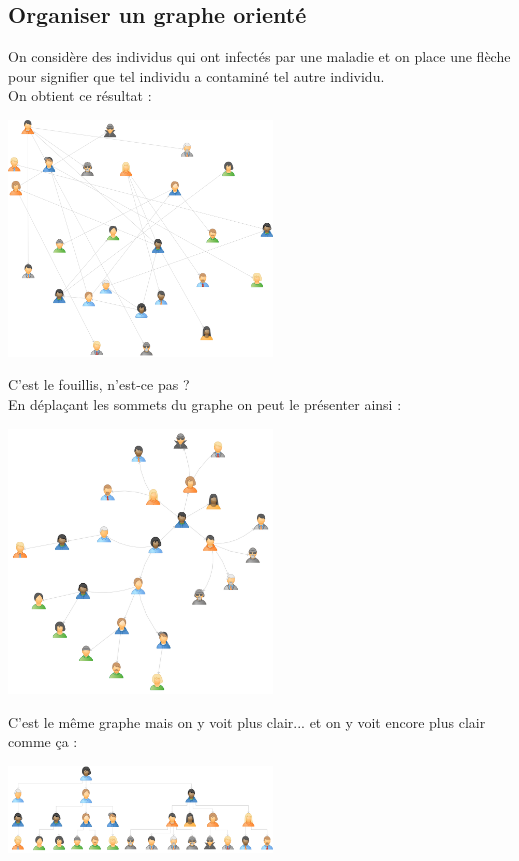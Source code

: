\subsection{Organiser un graphe orienté}

On considère des individus qui ont infectés par une maladie et on place une flèche pour signifier que tel individu a contaminé tel autre individu.\\
On obtient ce résultat :
\begin{center}
    \includegraphics[width=7cm]{graphes/img/graphe2_random.png}
\end{center}
C'est le fouillis, n'est-ce pas ? \\
En déplaçant les sommets du graphe on peut le présenter ainsi :
\begin{center}
    \includegraphics[width=7cm]{graphes/img/graphe2_radial.png}
\end{center}
C'est le même graphe mais on y voit plus clair... et on y voit encore plus clair comme ça :
\begin{center}
    \includegraphics[width=7cm]{graphes/img/graphe2_tree.png}
\end{center}
